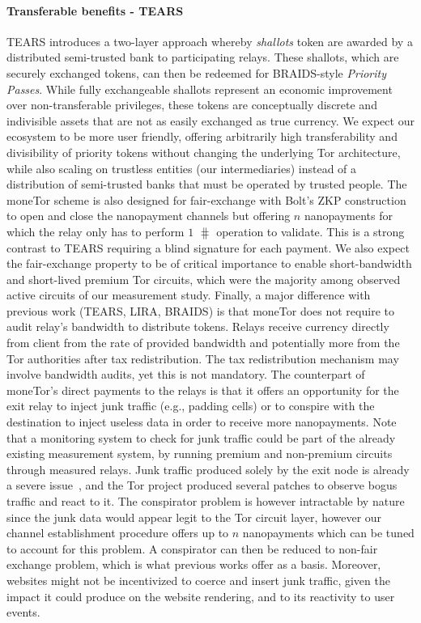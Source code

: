 \paragraph*{Transferable benefits - TEARS} TEARS introduces a two-layer approach
whereby \emph{shallots} token are awarded by a distributed semi-trusted bank to
participating relays. These shallots, which are securely exchanged tokens, can
then be redeemed for BRAIDS-style \emph{Priority Passes}. While fully
exchangeable shallots represent an economic improvement over non-transferable
privileges, these tokens are conceptually discrete and indivisible assets that
are not as easily exchanged as true currency. We expect our ecosystem to be more
user friendly, offering arbitrarily high transferability and divisibility of
priority tokens without changing the underlying Tor architecture, while also
scaling on trustless entities (our intermediaries) instead of a distribution of
semi-trusted banks that must be operated by trusted people. The moneTor scheme
is also designed for fair-exchange with Bolt's ZKP construction to open and
close the nanopayment channels but offering $n$ nanopayments for which the relay
only has to perform $1$ $\hash$ operation to validate. This is a strong contrast
to TEARS requiring a blind signature for each payment. We also expect the
fair-exchange property to be of critical importance to enable short-bandwidth
and short-lived premium Tor circuits, which were the majority among observed
active circuits of our measurement study. Finally, a major difference with
previous work (TEARS, LIRA, BRAIDS) is that moneTor does not require to audit
relay's bandwidth to distribute tokens. Relays receive currency directly from
client from the rate of provided bandwidth and potentially more from the Tor
authorities after tax redistribution. The tax redistribution mechanism may
involve bandwidth audits, yet this is not mandatory. The counterpart of
moneTor's direct payments to the relays is that it offers an opportunity for the
exit relay to inject junk traffic (e.g., padding cells) or to conspire with the
destination to inject useless data in order to receive more nanopayments. Note
that a monitoring system to check for junk traffic could be part of the already
existing measurement system, by running premium and non-premium circuits through
measured relays. Junk traffic produced solely by the exit node is already a
severe issue~\cite{rochet2018dropping}, and the Tor project produced several
patches to observe bogus traffic and react to it. The conspirator problem is
however intractable by nature since the junk data would appear legit to the Tor
circuit layer, however our channel establishment procedure offers up to $n$
nanopayments which can be tuned to account for this problem. A conspirator can
then be reduced to non-fair exchange problem, which is what previous works offer
as a basis. Moreover, websites might not be incentivized to coerce and insert
junk traffic, given the impact it could produce on the website rendering, and to
its reactivity to user events.




